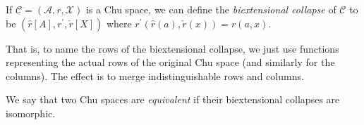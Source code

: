 \documentclass[12pt]{article}
\begin{document}
If $\mathcal{C}=(\mathcal{A},r,\mathcal{X})$ is a Chu space, we can define the \emph{biextensional collapse} of $\mathcal{C}$ to be $(\hat{r}[A],r^\prime,\check{r}[X])$ where $r^\prime(\hat{r}(a),\check{r}(x))=r(a,x)$.

That is, to name the rows of the biextensional collapse, we just use functions representing the actual rows of the original Chu space (and similarly for the columns).  The effect is to merge indistinguishable rows and columns.

We say that two Chu spaces are \emph{equivalent} if their biextensional collapses are isomorphic.
\end{document}
